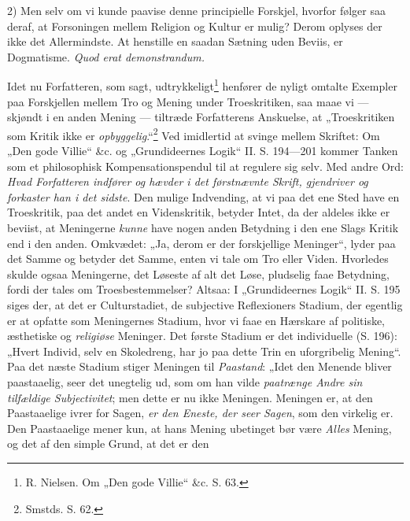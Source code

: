 \documentclass[12pt,a4paper]{book}
\newcommand{\opage}[1]{\marginnote{\footnotesize\textit{[#1]}}}
\begin{document}
2) Men selv om vi kunde paavise denne principielle
Forskjel, hvorfor følger saa deraf, at Forsoningen mellem
Religion og Kultur er mulig? Derom oplyses der
ikke det Allermindste. At henstille en saadan Sætning
uden Beviis, er Dogmatisme. \textit{Quod erat demonstrandum.}

\opage{84}\setcounter{footnote}{0}%
Idet nu Forfatteren, som sagt, udtrykkeligt\footnote{R. Nielsen. Om „Den gode Villie“ \&c. S. 63.} henfører
de nyligt omtalte Exempler paa Forskjellen mellem
Tro og Mening under Troeskritiken, saa maae vi
--- skjøndt i en anden Mening --- tiltræde Forfatterens
Anskuelse, at „Troeskritiken som Kritik ikke er \emph{opbyggelig}.“\footnote{Smstds. S. 62.}
Ved imidlertid at svinge mellem
Skriftet: Om „Den gode Villie“ \&c. og „Grundideernes
Logik“ II. S. 194---201 kommer Tanken som et philosophisk
Kompensationspendul til at regulere sig selv.
Med andre Ord: \emph{Hvad Forfatteren indfører og
hævder i det førstnævnte Skrift, gjendriver
og forkaster han i det sidste}. Den mulige
Indvending, at vi paa det ene Sted have en Troeskritik,
paa det andet en Videnskritik, betyder Intet, da der
aldeles ikke er beviist, at Meningerne \emph{kunne} have nogen
anden Betydning i den ene Slags Kritik end i den anden.
Omkvædet: „Ja, derom er der forskjellige Meninger“,
lyder paa det Samme og betyder det Samme, enten vi
tale om Tro eller Viden. Hvorledes skulde ogsaa Meningerne,
det Løseste af alt det Løse, pludselig faae Betydning,
fordi der tales om Troesbestemmelser? Altsaa: I
„Grundideernes Logik“ II. S. 195 siges der, at det
er Culturstadiet, de subjective Reflexioners Stadium, der
egentlig er at opfatte som Meningernes Stadium, hvor
vi faae en Hærskare af politiske, æsthetiske og \emph{religiøse}
Meninger. Det første Stadium er det individuelle
(S. 196): „Hvert Individ, selv en Skoledreng, har jo
\opage{85}\setcounter{footnote}{0}%
paa dette Trin en uforgribelig Mening“. Paa det
næste Stadium stiger Meningen til \emph{Paastand}: „Idet
den Menende bliver paastaaelig, seer det unegtelig ud,
som om han vilde \emph{paatrænge Andre sin tilfældige
Subjectivitet}; men dette er nu ikke Meningen.
Meningen er, at den Paastaaelige ivrer for Sagen, \emph{er den
Eneste, der seer Sagen}, som den virkelig er. Den Paastaaelige
mener kun, at hans Mening ubetinget bør være \emph{Alles}
Mening, og det af den simple Grund, at det er den
\end{document}
